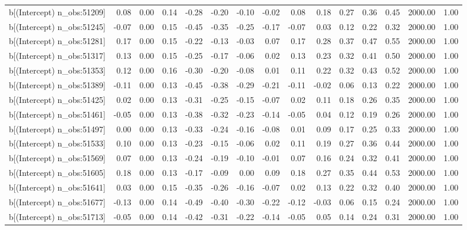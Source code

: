 \begin{table}[ht]
\begin{tabular}{rrrrrrrrrrrrrrr}
  b[(Intercept) n\_obs:51209] & 0.08 & 0.00 & 0.14 & -0.28 & -0.20 & -0.10 & -0.02 & 0.08 & 0.18 & 0.27 & 0.36 & 0.45 & 2000.00 & 1.00 \\ 
  b[(Intercept) n\_obs:51245] & -0.07 & 0.00 & 0.15 & -0.45 & -0.35 & -0.25 & -0.17 & -0.07 & 0.03 & 0.12 & 0.22 & 0.32 & 2000.00 & 1.00 \\ 
  b[(Intercept) n\_obs:51281] & 0.17 & 0.00 & 0.15 & -0.22 & -0.13 & -0.03 & 0.07 & 0.17 & 0.28 & 0.37 & 0.47 & 0.55 & 2000.00 & 1.00 \\ 
  b[(Intercept) n\_obs:51317] & 0.13 & 0.00 & 0.15 & -0.25 & -0.17 & -0.06 & 0.02 & 0.13 & 0.23 & 0.32 & 0.41 & 0.50 & 2000.00 & 1.00 \\ 
  b[(Intercept) n\_obs:51353] & 0.12 & 0.00 & 0.16 & -0.30 & -0.20 & -0.08 & 0.01 & 0.11 & 0.22 & 0.32 & 0.43 & 0.52 & 2000.00 & 1.00 \\ 
  b[(Intercept) n\_obs:51389] & -0.11 & 0.00 & 0.13 & -0.45 & -0.38 & -0.29 & -0.21 & -0.11 & -0.02 & 0.06 & 0.13 & 0.22 & 2000.00 & 1.00 \\ 
  b[(Intercept) n\_obs:51425] & 0.02 & 0.00 & 0.13 & -0.31 & -0.25 & -0.15 & -0.07 & 0.02 & 0.11 & 0.18 & 0.26 & 0.35 & 2000.00 & 1.00 \\ 
  b[(Intercept) n\_obs:51461] & -0.05 & 0.00 & 0.13 & -0.38 & -0.32 & -0.23 & -0.14 & -0.05 & 0.04 & 0.12 & 0.19 & 0.26 & 2000.00 & 1.00 \\ 
  b[(Intercept) n\_obs:51497] & 0.00 & 0.00 & 0.13 & -0.33 & -0.24 & -0.16 & -0.08 & 0.01 & 0.09 & 0.17 & 0.25 & 0.33 & 2000.00 & 1.00 \\ 
  b[(Intercept) n\_obs:51533] & 0.10 & 0.00 & 0.13 & -0.23 & -0.15 & -0.06 & 0.02 & 0.11 & 0.19 & 0.27 & 0.36 & 0.44 & 2000.00 & 1.00 \\ 
  b[(Intercept) n\_obs:51569] & 0.07 & 0.00 & 0.13 & -0.24 & -0.19 & -0.10 & -0.01 & 0.07 & 0.16 & 0.24 & 0.32 & 0.41 & 2000.00 & 1.00 \\ 
  b[(Intercept) n\_obs:51605] & 0.18 & 0.00 & 0.13 & -0.17 & -0.09 & 0.00 & 0.09 & 0.18 & 0.27 & 0.35 & 0.44 & 0.53 & 2000.00 & 1.00 \\ 
  b[(Intercept) n\_obs:51641] & 0.03 & 0.00 & 0.15 & -0.35 & -0.26 & -0.16 & -0.07 & 0.02 & 0.13 & 0.22 & 0.32 & 0.40 & 2000.00 & 1.00 \\ 
  b[(Intercept) n\_obs:51677] & -0.13 & 0.00 & 0.14 & -0.49 & -0.40 & -0.30 & -0.22 & -0.12 & -0.03 & 0.06 & 0.15 & 0.24 & 2000.00 & 1.00 \\ 
  b[(Intercept) n\_obs:51713] & -0.05 & 0.00 & 0.14 & -0.42 & -0.31 & -0.22 & -0.14 & -0.05 & 0.05 & 0.14 & 0.24 & 0.31 & 2000.00 & 1.00 \\ 

\end{tabular}
\end{table}
